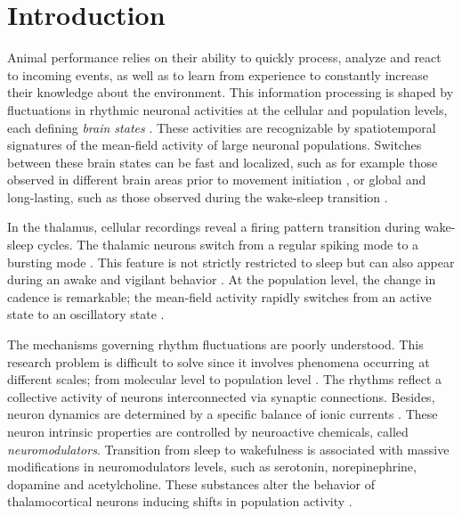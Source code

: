 \section{Introduction}
Animal performance relies on their ability to quickly process, analyze and react to incoming events, as well as to learn from experience to constantly increase their knowledge about the environment. This information processing is shaped by fluctuations in rhythmic neuronal activities at the cellular and population levels, each defining \textit{brain states} \citep{buzsaki_rhythms_2009, cannon_neurosystems_2014}. These activities are recognizable by spatiotemporal signatures of the mean-field activity of large neuronal populations. Switches between these brain states can be fast and localized, such as for example those observed in different brain areas prior to movement initiation \citep{kuhn_event-related_2004}, or global and long-lasting, such as those observed during the wake-sleep transition  \citep{mccormick_brain_2015,mcginley_waking_2015}.

In the thalamus, cellular recordings reveal a firing pattern transition during wake-sleep cycles. The thalamic neurons switch from a regular spiking mode to a bursting mode 
\citep{mccormick_sleep_1997, guillery_thalamic_2002}. This feature is not strictly restricted to sleep but can also appear during an awake and vigilant behavior \citep{sherman_functional_1996, murray_sherman_tonic_2001, ramcharan_burst_2000, ding_changes_2016, cui_role_2011}. At the population level, the change in cadence is remarkable; the mean-field activity rapidly switches from an active state to an oscillatory state \citep{zagha_neural_2014, wang_neurophysiological_2010}.

The mechanisms governing rhythm fluctuations are poorly understood. This research problem is difficult to solve since it involves phenomena occurring at different scales; from molecular level to population level \citep{wang_neurophysiological_2010}. The rhythms reflect a collective activity of neurons interconnected via synaptic connections. Besides, neuron dynamics are determined by a specific balance of ionic currents \citep{yu_overview_2005}. These neuron intrinsic properties are controlled by neuroactive chemicals, called \textit{neuromodulators}. Transition from sleep to wakefulness is  associated with massive modifications in neuromodulators levels, such as serotonin, norepinephrine, dopamine and acetylcholine. These substances alter the behavior of thalamocortical neurons inducing shifts in population activity \citep{zagha_neural_2014, mccormick_sleep_1997, murray_sherman_tonic_2001, mcginley_waking_2015, ding_changes_2016}.


